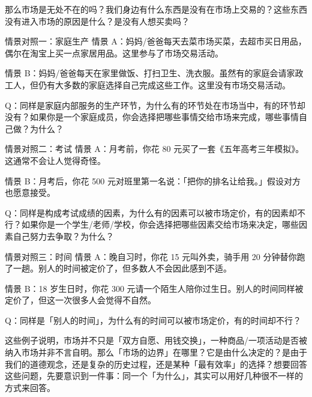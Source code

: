 \documentclass[10pt,a4paper]{ctexart}
\begin{document}

那么市场是无处不在的吗？我们身边有什么东西是没有在市场上交易的？这些东西没有进入市场的原因是什么？是没有人想买卖吗？

\begin{examplebox}{情景对照一：家庭生产}
情景 A：妈妈/爸爸每天去菜市场买菜，去超市买日用品，偶尔在淘宝上买一点家居用品。这里参与了市场交易活动。

情景 B：妈妈/爸爸每天在家里做饭、打扫卫生、洗衣服。虽然有的家庭会请家政工人，但仍有大多数的家庭选择自己完成这些工作。这里没有市场交易活动。

Q：同样是家庭内部服务的生产环节，为什么有的环节处在市场当中，有的环节却没有？如果你是一个家庭成员，你会选择把哪些事情交给市场来完成，哪些事情自己做？为什么？
\end{examplebox}

\begin{examplebox}{情景对照二：考试}
情景 A：月考前，你花 80 元买了一套《五年高考三年模拟》。这通常不会让人觉得奇怪。

情景 B：月考后，你花 500 元对班里第一名说：「把你的排名让给我。」假设对方也愿意接受。

Q：同样是构成考试成绩的因素，为什么有的因素可以被市场定价，有的因素却不行？如果你是一个学生/老师/学校，你会选择把哪些因素交给市场来决定，哪些因素自己努力去争取？为什么？
\end{examplebox}

\begin{examplebox}{情景对照三：时间}
情景 A：晚自习时，你花 15 元叫外卖，骑手用 20 分钟替你跑了一趟。别人的时间被定价了，但多数人不会因此感到不适。

情景 B：18 岁生日时，你花 300 元请一个陌生人陪你过生日。别人的时间同样被定价了，但这一次很多人会觉得不自然。

Q：同样是「别人的时间」，为什么有的时间可以被市场定价，有的时间却不行？
\end{examplebox}

这些例子说明，市场并不只是「双方自愿、用钱交换」，一种商品/一项活动是否被纳入市场并非不言自明。那么「市场的边界」在哪里？它是由什么决定的？是由于我们的道德观念，还是复杂的历史过程，还是某种「最有效率」的选择？想要回答这些问题，先要意识到一件事：同一个「为什么」，其实可以用好几种很不一样的方式来回答。
\end{document}
